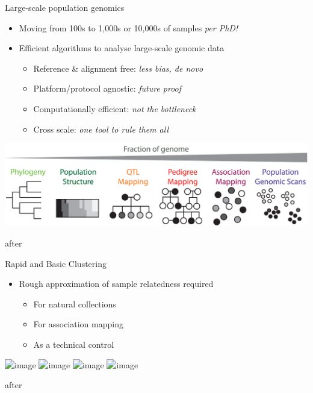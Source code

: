 \documentclass[t]{beamer}
\begin{document}
\begin{frame}{Large-scale population genomics}
  \begin{itemize}
    \item Moving from 100s to 1,000s or 10,000s of samples \textit{per PhD!}
      \pause
    \item Efficient algorithms to analyse large-scale genomic data
    \begin{itemize}
      \item Reference \& alignment free: \textit{less bias, de novo}
      \item Platform/protocol agnostic: \textit{future proof}
      \item Computationally efficient: \textit{not the bottleneck}
      \item Cross scale: \textit{one tool to rule them all}
    \end{itemize}
  \end{itemize}
  \begin{center}
    \includegraphics[width=\textwidth]{img/cross-scale.png}
  \end{center}
  \tiny{after \textcite{peterson_double_2012}}
\end{frame}


\begin{frame}{Rapid and Basic Clustering}
  \begin{itemize}
    \item Rough approximation of sample relatedness required
      \begin{itemize}
        \item For natural collections
        \item For association mapping
        \item As a technical control
      \end{itemize}
  \end{itemize}
  \pause
  \begin{center}
    \includegraphics<2>[width=\textwidth]{img/restruct-1}
    \includegraphics<3>[width=\textwidth]{img/restruct-2}
    \includegraphics<4>[width=\textwidth]{img/restruct-3}
    \includegraphics<5>[width=\textwidth]{img/restruct-4}
  \end{center}
  \tiny{after \textcite{brachi_genome-wide_2011}}
\end{frame}
\end{document}
